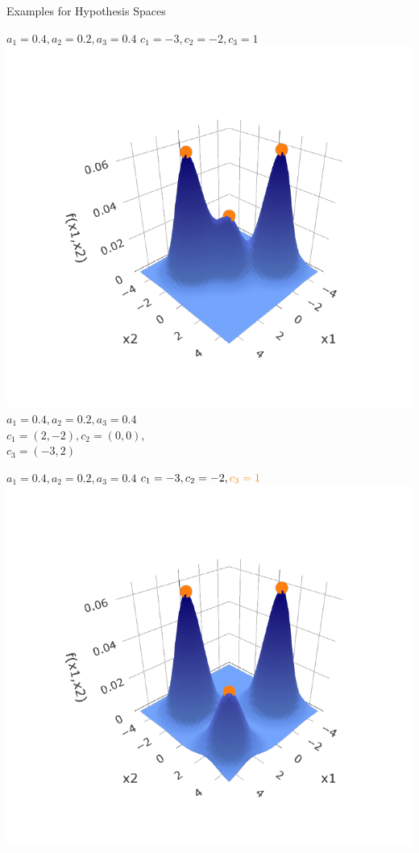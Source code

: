 \documentclass[11pt,compress,t,notes=noshow, xcolor=table]{beamer}
\begin{document}
\begin{vbframe}{Examples for Hypothesis Spaces}
\tiny

\begin{minipage}{0.33\textwidth}
  \begin{center}
    $a_1 = 0.4, a_2 = 0.2, a_3 = 0.4$
    $c_1 = -3, c_2 = -2, c_3 = 1$
    \includegraphics[width=\textwidth]{figure/hs-rbf-network-3d-1.pdf}
    $a_1 = 0.4, a_2 = 0.2, a_3 = 0.4$ \\
    $c_1 = (2,-2), c_2 = (0,0)$, \\
    $c_3 = (-3,2)$
  \end{center}
\end{minipage}%
\begin{minipage}{0.33\textwidth}
  \begin{center}
    $a_1 = 0.4, a_2 = 0.2, a_3 = 0.4$
    $c_1 = -3, c_2 = -2, \textcolor{orange}{c_3 = 1}$
    \includegraphics[width=\textwidth]{figure/hs-rbf-network-3d-2.pdf}

\end{center}
\end{minipage}
\end{vbframe}
\end{document}
